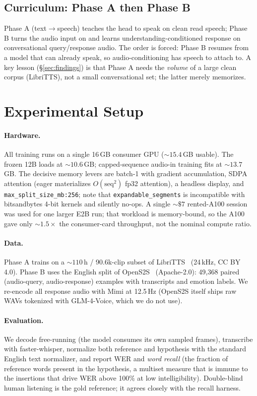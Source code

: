 \documentclass[11pt]{article}
\begin{document}
\subsection{Curriculum: Phase A then Phase B}
Phase A (text$\to$speech) teaches the head to speak on clean read speech; Phase B
turns the audio input on and learns understanding-conditioned response on
conversational query/response audio. The order is forced: Phase B resumes from a
model that can already speak, so audio-conditioning has speech to attach to. A key
lesson (\S\ref{sec:findings}) is that Phase A needs the \emph{volume} of a large
clean corpus (LibriTTS), not a small conversational set; the latter merely
memorizes.

\section{Experimental Setup}
\label{sec:setup}
\paragraph{Hardware.} All training runs on a single 16\,GB consumer GPU
(${\sim}15.4$\,GB usable). The frozen 12B loads at ${\sim}10.6$\,GB; capped-sequence
audio-in training fits at ${\sim}13.7$\,GB. The decisive memory levers are batch-1
with gradient accumulation, SDPA attention (eager materializes $O(\text{seq}^2)$
fp32 attention), a headless display, and \texttt{max\_split\_size\_mb:256}; note
that \texttt{expandable\_segments} is incompatible with bitsandbytes 4-bit kernels
and silently no-ops. A single ${\sim}\$7$ rented-A100 session was used for one
larger E2B run; that workload is memory-bound, so the A100 gave only ${\sim}1.5\times$
the consumer-card throughput, not the nominal compute ratio.

\paragraph{Data.} Phase A trains on a ${\sim}110$\,h / 90.6k-clip subset of
LibriTTS~\citep{zen2019libritts} (24\,kHz, CC BY 4.0). Phase B uses the English
split of OpenS2S~\citep{casia2025opens2s} (Apache-2.0): 49{,}368 paired
(audio-query, audio-response) examples with transcripts and emotion labels. We
re-encode all response audio with Mimi at 12.5\,Hz (OpenS2S itself ships raw WAVs
tokenized with GLM-4-Voice, which we do not use).

\paragraph{Evaluation.} We decode free-running (the model consumes its own
sampled frames), transcribe with faster-whisper, normalize both reference and
hypothesis with the standard English text normalizer, and report WER and
\emph{word recall} (the fraction of reference words present in the hypothesis,
a multiset measure that is immune to the insertions that drive WER above 100\% at
low intelligibility). Double-blind human listening is the gold reference; it
agrees closely with the recall harness.
\end{document}
